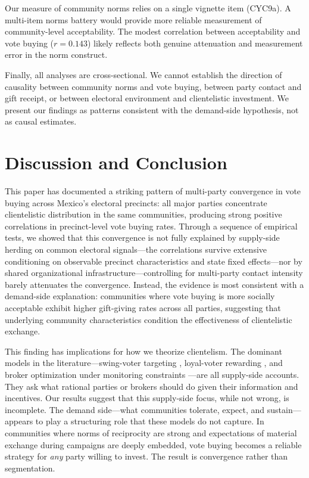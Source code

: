\documentclass[12pt,letterpaper]{article}
\begin{document}
Our measure of community norms relies on a single vignette item (CYC9a). A multi-item norms battery would provide more reliable measurement of community-level acceptability. The modest correlation between acceptability and vote buying ($r = 0.143$) likely reflects both genuine attenuation and measurement error in the norm construct.

Finally, all analyses are cross-sectional. We cannot establish the direction of causality between community norms and vote buying, between party contact and gift receipt, or between electoral environment and clientelistic investment. We present our findings as patterns consistent with the demand-side hypothesis, not as causal estimates.


\section{Discussion and Conclusion}

This paper has documented a striking pattern of multi-party convergence in vote buying across Mexico's electoral precincts: all major parties concentrate clientelistic distribution in the same communities, producing strong positive correlations in precinct-level vote buying rates. Through a sequence of empirical tests, we showed that this convergence is not fully explained by supply-side herding on common electoral signals---the correlations survive extensive conditioning on observable precinct characteristics and state fixed effects---nor by shared organizational infrastructure---controlling for multi-party contact intensity barely attenuates the convergence. Instead, the evidence is most consistent with a demand-side explanation: communities where vote buying is more socially acceptable exhibit higher gift-giving rates across all parties, suggesting that underlying community characteristics condition the effectiveness of clientelistic exchange.

This finding has implications for how we theorize clientelism. The dominant models in the literature---swing-voter targeting \citep{stokes2005perverse}, loyal-voter rewarding \citep{cox1986electoral, nichter2008vote}, and broker optimization under monitoring constraints \citep{stokes2013brokers, larreguy2016parties}---are all supply-side accounts. They ask what rational parties or brokers should do given their information and incentives. Our results suggest that this supply-side focus, while not wrong, is incomplete. The demand side---what communities tolerate, expect, and sustain---appears to play a structuring role that these models do not capture. In communities where norms of reciprocity are strong and expectations of material exchange during campaigns are deeply embedded, vote buying becomes a reliable strategy for \textit{any} party willing to invest. The result is convergence rather than segmentation.
\end{document}

